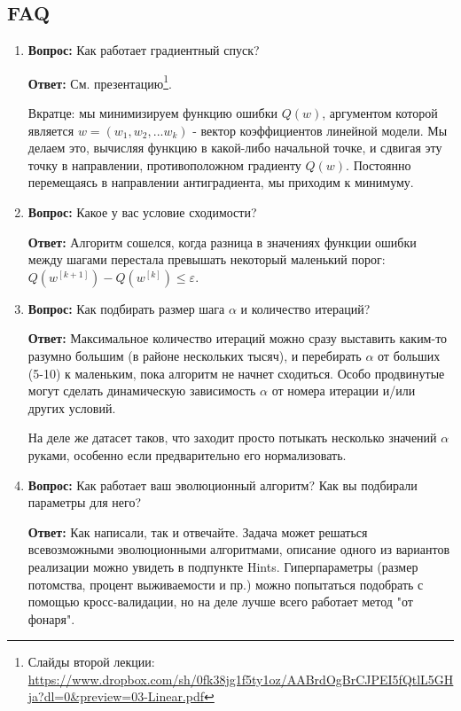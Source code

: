 \documentclass[a4paper, unicode]{article}
\begin{document}
\subsection{FAQ}
\label{sec:orgheadline9}
\begin{enumerate}
\item \textbf{Вопрос:}
   Как работает градиентный спуск?

\textbf{Ответ:}
См. презентацию\footnote{Слайды второй лекции: \url{https://www.dropbox.com/sh/0fk38jg1f5ty1oz/AABrdOgBrCJPEI5fQtlL5GHja?dl=0&preview=03-Linear.pdf}}.

Вкратце: мы минимизируем функцию ошибки \(Q(w)\), аргументом которой является
\(w = (w_1, w_2, ... w_k)\) - вектор коэффициентов линейной модели. Мы делаем
это, вычисляя функцию в какой-либо начальной точке, и сдвигая эту точку в
направлении, противоположном градиенту \(Q(w)\). Постоянно перемещаясь в
направлении антиградиента, мы приходим к минимуму.

\item \textbf{Вопрос:}
   Какое у вас условие сходимости?

\textbf{Ответ:}
Алгоритм сошелся, когда разница в значениях функции ошибки между шагами
перестала превышать некоторый маленький порог:
\(Q(w^{[k+1]}) - Q(w^{[k]}) \leqslant \varepsilon\).

\item \textbf{Вопрос:}
   Как подбирать размер шага \(\alpha\) и количество итераций?

\textbf{Ответ:}
Максимальное количество итераций можно сразу выставить каким-то разумно
большим (в районе нескольких тысяч), и перебирать \(\alpha\) от больших (5-10)
к маленьким, пока алгоритм не начнет сходиться. Особо продвинутые могут
сделать динамическую зависимость \(\alpha\) от номера итерации и/или других
условий.

На деле же датасет таков, что заходит просто потыкать несколько значений
\(\alpha\) руками, особенно если предварительно его нормализовать.

\item \textbf{Вопрос:}
   Как работает ваш эволюционный алгоритм? Как вы подбирали параметры для него?

\textbf{Ответ:}
Как написали, так и отвечайте. Задача может решаться всевозможными
эволюционными алгоритмами, описание одного из вариантов реализации можно
увидеть в подпункте Hints. Гиперпараметры (размер потомства, процент
выживаемости и пр.) можно попытаться подобрать с помощью кросс-валидации, но
на деле лучше всего работает метод "от фонаря".
\end{enumerate}
\end{document}
